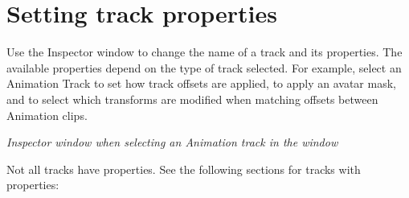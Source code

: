 \chapter{Setting track properties}
\hypertarget{md__library_2_package_cache_2com_8unity_8timeline_0d1_87_86_2_documentation_0i_2insp__trk}{}\label{md__library_2_package_cache_2com_8unity_8timeline_0d1_87_86_2_documentation_0i_2insp__trk}
\label{md__library_2_package_cache_2com_8unity_8timeline_0d1_87_86_2_documentation_0i_2insp__trk_autotoc_md1182}%
%
 Use the Inspector window to change the name of a track and its properties. The available properties depend on the type of track selected. For example, select an Animation Track to set how track offsets are applied, to apply an avatar mask, and to select which transforms are modified when matching offsets between Animation clips.



{\itshape Inspector window when selecting an Animation track in the  window}

Not all tracks have properties. See the following sections for tracks with properties\+:


\begin{DoxyItemize}
\item {}
\item {} 
\end{DoxyItemize}
